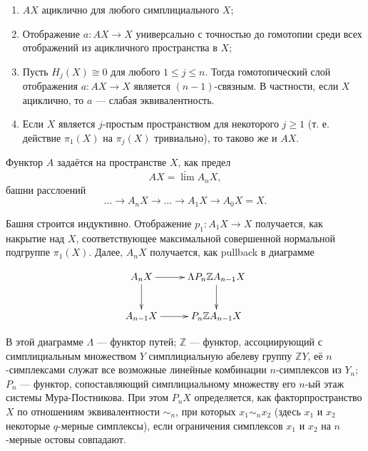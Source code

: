 \documentclass[14pt, dvipsnames]{extarticle}
\theoremstyle{definition}
\theoremstyle{remark}
\begin{document}
\begin{enumerate} 

\item $AX$ ациклично для любого симплициального $X$;

\item Отображение $a: AX\to X$ универсально с точностью до гомотопии среди всех отображений из ацикличного пространства в $X$;

\item Пусть $H_j(X)\cong 0$ для любого $1\leqslant j \leqslant n$. Тогда гомотопический слой отображения $a: AX\to X$ является $(n-1)$-связным. В частности, если $X$ ациклично, то $a$ --- слабая эквивалентность. \label{DrorProperty}

\item Если $X$ является $j$-простым пространством для некоторого $j\geqslant 1$ (т. е. действие $\pi_1(X)$ на $\pi_j(X)$ тривиально), то таково же и $AX$. 

\end{enumerate}

Функтор $A$ задаётся на пространстве $X$, как предел $$AX = \underleftarrow{\lim} A_n X,$$ башни расслоений $$...\to A_n X\to ...\to A_1X \to A_0X = X.$$

Башня строится индуктивно. Отображение $p_1 : A_1X\to X$ получается, как накрытие над $X$, соответствующее максимальной совершенной нормальной подгруппе $\pi_1(X)$. Далее, $A_nX$ получается, как pullback в диаграмме  

\begin{equation}\label{Dror}
\xymatrix{
    A_nX \ar[r] \ar[d] & \Lambda P_n \mathbb{Z} A_{n-1} X \ar[d] \\
    A_{n-1}X \ar[r]       & P_n\mathbb{Z}A_{n-1}X }
\end{equation}
    
 В этой диаграмме $\Lambda$ --- функтор путей; $\mathbb{Z}$ --- функтор, ассоциирующий с симплициальным множеством $Y$ симплициальную абелеву группу $\mathbb{Z}Y$, её $n$-симплексами служат все возможные линейные комбинации $n$-симплексов из $Y_n$; $P_n$ --- функтор, сопоставляющий симплициальному множеству его $n$-ый этаж системы Мура-Постникова. При этом $P_nX$ определяется, как факторпространство $X$ по отношениям эквивалентности $\sim_n$, при которых $x_1\sim_n x_2$ (здесь $x_1$ и $x_2$ некоторые $q$-мерные симплексы), если ограничения симплексов $x_1$ и $x_2$ на $n$-мерные остовы совпадают. 
\end{document}
